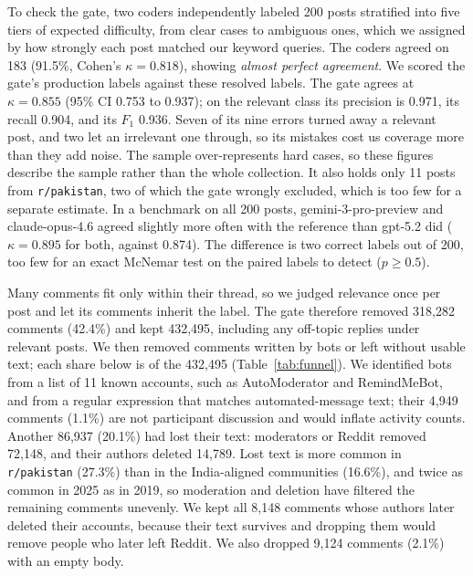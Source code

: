 

To check the gate, two coders independently labeled 200 posts stratified into five tiers of expected difficulty, from clear cases to ambiguous ones, which we assigned by how strongly each post matched our keyword queries. The coders agreed on 183 (91.5\%, Cohen's $\kappa = 0.818$), showing \textit{almost perfect agreement}. We scored the gate's production labels against these resolved labels. The gate agrees at $\kappa = 0.855$ (95\% CI 0.753 to 0.937); on the relevant class its precision is 0.971, its recall 0.904, and its $F_1$ 0.936. Seven of its nine errors turned away a relevant post, and two let an irrelevant one through, so its mistakes cost us coverage more than they add noise. The sample over-represents hard cases, so these figures describe the sample rather than the whole collection. It also holds only 11 posts from \texttt{r/pakistan}, two of which the gate wrongly excluded, which is too few for a separate estimate. In a benchmark on all 200 posts, gemini-3-pro-preview and claude-opus-4.6 agreed slightly more often with the reference than gpt-5.2 did ($\kappa = 0.895$ for both, against 0.874). The difference is two correct labels out of 200, too few for an exact McNemar test on the paired labels to detect ($p \geq 0.5$). 


Many comments fit only within their thread, so we judged relevance once per post and let its comments inherit the label. The gate therefore removed 318,282 comments (42.4\%) and kept 432,495, including any off-topic replies under relevant posts. We then removed comments written by bots or left without usable text; each share below is of the 432,495 (Table~\ref{tab:funnel}). We identified bots from a list of 11 known accounts, such as AutoModerator and RemindMeBot, and from a regular expression that matches automated-message text; their 4,949 comments (1.1\%) are not participant discussion and would inflate activity counts. Another 86,937 (20.1\%) had lost their text: moderators or Reddit removed 72,148, and their authors deleted 14,789. Lost text is more common in \texttt{r/pakistan} (27.3\%) than in the India-aligned communities (16.6\%), and twice as common in 2025 as in 2019, so moderation and deletion have filtered the remaining comments unevenly. We kept all 8,148 comments whose authors later deleted their accounts, because their text survives and dropping them would remove people who later left Reddit. We also dropped 9,124 comments (2.1\%) with an empty body.


